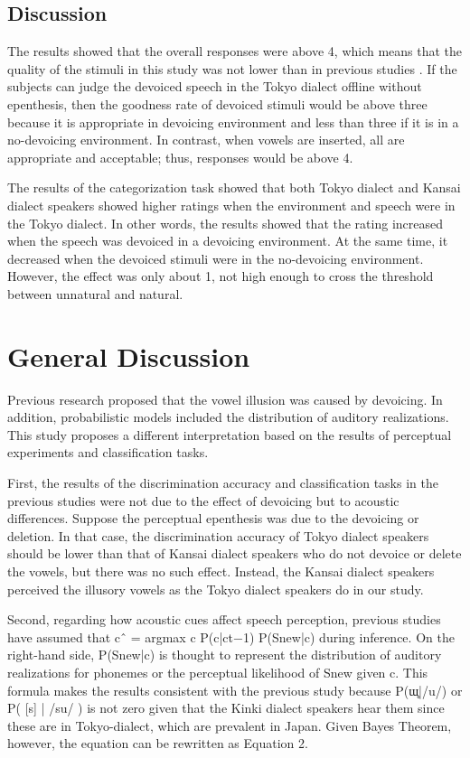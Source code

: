 \documentclass[a4paper,11pt,twocolumn]{article}
\begin{document}
\subsection{Discussion}

The results showed that the overall responses were above 4, which means that the quality of the stimuli in this study was not lower than in previous studies \cite{kilpatrick2018}. If the subjects can judge the devoiced speech in the Tokyo dialect offline without epenthesis, then the goodness rate of devoiced stimuli would be above three because it is appropriate in devoicing environment and less than three if it is in a no-devoicing environment. In contrast, when vowels are inserted, all are appropriate and acceptable; thus, responses would be above 4.

The results of the categorization task showed that both Tokyo dialect and Kansai dialect speakers showed higher ratings when the environment and speech were in the Tokyo dialect. In other words, the results showed that the rating increased when the speech was devoiced in a devoicing environment. At the same time, it decreased when the devoiced stimuli were in the no-devoicing environment. However, the effect was only about 1, not high enough to cross the threshold between unnatural and natural.

\section{General Discussion}

Previous research proposed that the vowel illusion was caused by devoicing. In addition, probabilistic models included the distribution of auditory realizations. This study proposes a different interpretation based on the results of perceptual experiments and classification tasks.

First, the results of the discrimination accuracy and classification tasks in the previous studies were not due to the effect of devoicing but to acoustic differences. Suppose the perceptual epenthesis was due to the devoicing or deletion. In that case, the discrimination accuracy of Tokyo dialect speakers should be lower than that of Kansai dialect speakers who do not devoice or delete the vowels, but there was no such effect. Instead, the Kansai dialect speakers perceived the illusory vowels as the Tokyo dialect speakers do in our study.

Second, regarding how acoustic cues affect speech perception, previous studies \cite{wilson, kishiyama} have assumed that cˆ = argmax c P(c|ct−1) P(Snew|c) during inference. On the right-hand side, P(Snew|c) is thought to represent the distribution of auditory realizations for phonemes or the perceptual likelihood of Snew given c. This formula makes the results consistent with the previous study because P(ɯ̥|/u/) or P( [s] | /su/ ) is not zero given that the Kinki dialect speakers hear them since these are in Tokyo-dialect, which are prevalent in Japan. Given Bayes Theorem, however, the equation can be rewritten as Equation 2.
\end{document}
